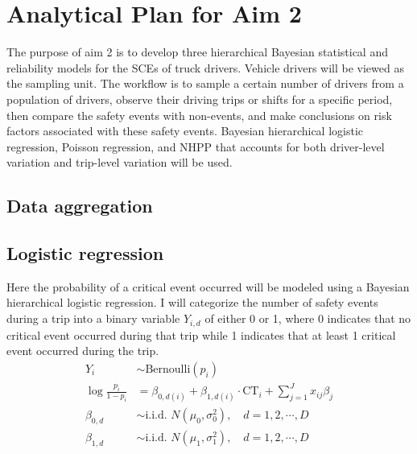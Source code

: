 \documentclass[12pt]{book}
\numberwithin{equation}{chapter}
\begin{document}
\hypertarget{analytical-plan-for-aim-2}{%
\section{Analytical Plan for Aim 2}\label{analytical-plan-for-aim-2}}

The purpose of aim 2 is to develop three hierarchical Bayesian statistical and reliability models for the SCEs of truck drivers. Vehicle drivers will be viewed as the sampling unit. The workflow is to sample a certain number of drivers from a population of drivers, observe their driving trips or shifts for a specific period, then compare the safety events with non-events, and make conclusions on risk factors associated with these safety events. Bayesian hierarchical logistic regression, Poisson regression, and NHPP that accounts for both driver-level variation and trip-level variation will be used.

\hypertarget{data-aggregation}{%
\subsection{Data aggregation}\label{data-aggregation}}

\hypertarget{logistic-regression}{%
\subsection{Logistic regression}\label{logistic-regression}}

Here the probability of a critical event occurred will be modeled using a Bayesian hierarchical logistic regression. I will categorize the number of safety events during a trip into a binary variable \(Y_{i, d}\) of either 0 or 1, where 0 indicates that no critical event occurred during that trip while 1 indicates that at least 1 critical event occurred during the trip.
\[
\begin{split}
Y_{i} &\sim \text{Bernoulli}(p_{i})\\
\log\frac{p_{i}}{1-p_{i}} &= \beta_{0, d(i)} + \beta_{1, d(i)} \cdot \text{CT}_i + \sum_{j=1}^{J} x_{ij}\beta_j\\
\beta_{0, d} &\sim \text{i.i.d. } N(\mu_0, \sigma_0^2), \quad d = 1, 2, \cdots, D\\
\beta_{1, d} &\sim \text{i.i.d. } N(\mu_1, \sigma_1^2), \quad d = 1, 2, \cdots, D
\label{eq:hierarchicallogit}
\end{split}
\]
\end{document}
